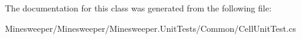 The documentation for this class was generated from the following file\+:\begin{DoxyCompactItemize}
\item 
Minesweeper/\+Minesweeper/\+Minesweeper.\+Unit\+Tests/\+Common/Cell\+Unit\+Test.\+cs\end{DoxyCompactItemize}
